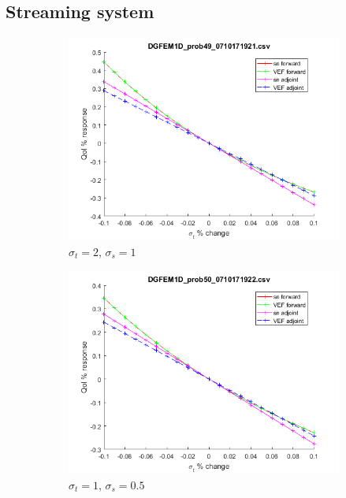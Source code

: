 \documentclass{article}
\newcommand{\sigt}{\sigma_t}
\newcommand{\sigs}{\sigma_s}
\begin{document}
\subsection{Streaming system}
\begin{figure}[H]
\label{InHomoPertt}
\centering
\begin{subfigure}{.5\textwidth}
  \centering
  \includegraphics[width=.8\linewidth]{figures/49sigtSens.png}
  \caption{$\sigt=2$, $\sigs=1$}
  \label{fig:sfig1}
\end{subfigure}%
\begin{subfigure}{.5\textwidth}
  \centering
  \includegraphics[width=.8\linewidth]{figures/50sigtSens.png}
  \caption{$\sigt=1$, $\sigs=0.5$}
  \label{fig:sfig2}
\end{subfigure}
\begin{subfigure}{.5\textwidth}
  \centering

\end{subfigure}
\end{figure}
\end{document}
